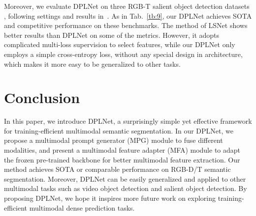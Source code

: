 \documentclass[10pt,twocolumn,letterpaper]{article}
\begin{document}
 Moreover, we evaluate DPLNet on three RGB-T salient object detection datasets \cite{VT821, VT1000, VT5000}, following settings and results in~\cite{LSNet}. As in Tab.~\ref{tb:9}, our DPLNet achieves SOTA and competitive performance on these benchmarks. The method of LSNet shows better results than DPLNet on some of the metrics. However, it adopts complicated multi-loss supervision to select features, while our DPLNet only employs a simple cross-entropy loss, without any special design in architecture, which makes it more easy to be generalized to other tasks.

\section{Conclusion}
In this paper, we introduce DPLNet, a surprisingly simple yet effective framework for training-efficient multimodal semantic segmentation. In our DPLNet, we propose a multimodal prompt generator (MPG) module to fuse different modalities, and present a multimodal feature adapter (MFA) module to adapt the frozen pre-trained backbone for better multimodal feature extraction. Our method achieves SOTA or comparable performance on RGB-D/T semantic segmentation. Moreover, DPLNet can be easily generalized and applied to other multimodal tasks such as video object detection and salient object detection. By proposing DPLNet, we hope it inspires more future work on exploring training-efficient multimodal dense prediction tasks. 





{
\small


}
\end{document}
